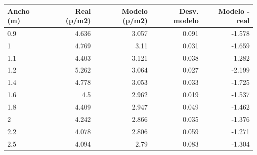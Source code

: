 \begin{tabular}{lrrrr}
\toprule
Ancho (m) & Real (p/m2) & Modelo (p/m2) & Desv. modelo & Modelo - real \\
\midrule
0.9 & 4.636 & 3.057 & 0.091 & -1.578 \\
1 & 4.769 & 3.11 & 0.031 & -1.659 \\
1.1 & 4.403 & 3.121 & 0.038 & -1.282 \\
1.2 & 5.262 & 3.064 & 0.027 & -2.199 \\
1.4 & 4.778 & 3.053 & 0.033 & -1.725 \\
1.6 & 4.5 & 2.962 & 0.019 & -1.537 \\
1.8 & 4.409 & 2.947 & 0.049 & -1.462 \\
2 & 4.242 & 2.866 & 0.035 & -1.376 \\
2.2 & 4.078 & 2.806 & 0.059 & -1.271 \\
2.5 & 4.094 & 2.79 & 0.083 & -1.304 \\
\bottomrule
\end{tabular}
